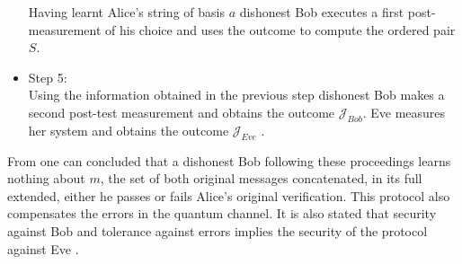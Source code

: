 \begin{refsection}
\begin{itemize}
		Having learnt Alice's string of basis $a$ dishonest Bob executes a first post-measurement of his choice and uses the outcome to compute the ordered pair $S$.
		\item Step 5:\\ Using the information obtained in the previous step dishonest Bob makes a second post-test measurement and obtains the outcome $\mathcal{J}_{Bob}$. Eve measures her system and obtains the outcome $\mathcal{J}_{Eve}$ \cite{Mayers}.
	\end{itemize}
	From \cite{Mayers} one can concluded that a dishonest Bob following these proceedings learns nothing about $m$, the set of both original messages concatenated, in its full extended, either he passes or fails Alice's original verification. This protocol also compensates the errors in the quantum channel. It is also stated that security against Bob and tolerance against errors implies the security of the protocol against Eve \cite{Mayers}.
	

\end{refsection}
